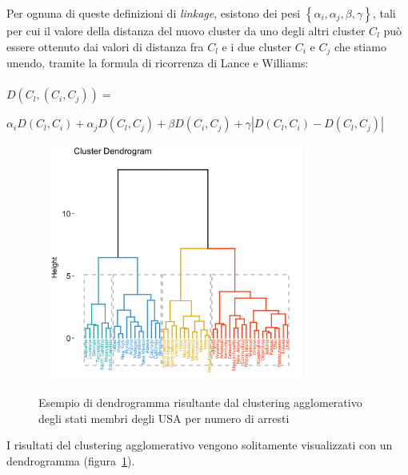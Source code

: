 \documentclass[12pt]{report}
\newcommand{\graffe}[1]{\left\lbrace #1 \right\rbrace}
\begin{document}
Per ognuna di queste definizioni di \textit{linkage}, esistono dei pesi $\graffe{ \alpha_i , \alpha_j , \beta , \gamma }$, tali per cui il valore della distanza del nuovo cluster da uno degli altri cluster $C_l$ può essere ottenuto dai valori di distanza fra $C_l$ e i due cluster $C_i$ e $C_j$ che stiamo unendo, tramite la formula di ricorrenza di Lance e Williams:\\ \ \\
$ D(C_l,(C_i,C_j)) = $ 
\begin{flushright}
	$\alpha_i D(C_l,C_i)+ \alpha_j D(C_l,C_j) + \beta D(C_i,C_j) + \gamma \left| D(C_l,C_i)-D(C_l,C_j) \right| $
\end{flushright}
\begin{figure} \centering
	\caption{Esempio di dendrogramma risultante dal clustering agglomerativo degli stati membri degli USA per numero di arresti}
	\label{fig:hcdendrogram}
	\ \newline 
	\includegraphics[width=0.75\textwidth,trim={1.5in 0.25in 0 1.25in},clip]{../images/hcdendrogram.png}
\end{figure}
I risultati del clustering agglomerativo vengono solitamente visualizzati con un dendrogramma (figura~\ref{fig:hcdendrogram}).
\end{document}
